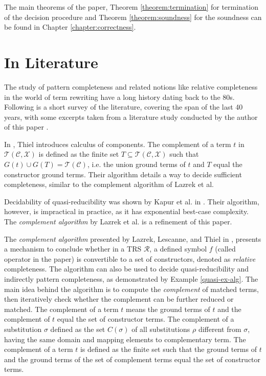 \documentclass{report}
\theoremstyle{definition}
\begin{document}
The main theorems of the paper, Theorem \ref{theorem:termination} for termination of the decision procedure and Theorem \ref{theorem:soundness} for the soundness can be found in Chapter \ref{chapter:correctness}.

\section{In Literature}\label{section:literature}
The study of pattern completeness and related notions like relative completeness in the world of term rewriting have a long history dating back to the 80s. Following is a short survey of the literature, covering the span of the last 40 years, with some excerpts taken from a literature study conducted by the author of this paper \cite{lit-me}.

In \cite{thiel}, Thiel introduces calculus of components. The complement of a term $t$ in $\mathcal{T}(\mathcal{C}, \mathcal{X})$ is defined as the finite set $T \subseteq \mathcal{T}(\mathcal{C}, \mathcal{X})$ such that $G(t) \cup G(T) = \mathcal{T}(\mathcal{C})$, i.e. the union ground terms of $t$ and $T$ equal the constructor ground terms. Their algorithm details a way to decide sufficient completeness, similar to the complement algorithm of Lazrek et al\cite{lazrek}.

Decidability of quasi-reducibility was shown by Kapur et al. in \cite{kapur}. Their algorithm, however, is impractical in practice, as it has exponential best-case complexity. The \textit{complement algorithm} by Lazrek et al. is a refinement of this paper.

The \textit{complement algorithm} presented by Lazrek, Lescanne, and Thiel in \cite{lazrek}, presents a mechanism to conclude whether in a TRS $\mathcal{R}$, a defined symbol $f$ (called operator in the paper) is convertible to a set of constructors, denoted as \textit{relative} completeness. The algorithm can also be used to decide quasi-reducibility and indirectly pattern completeness, as demonstrated by Example \ref{quasi-ex-alg}. The main idea behind the algorithm is to compute the \textit{complement} of matched terms, then iteratively check whether the complement can be further reduced or matched. The complement of a term $t$ means the ground terms of $t$ and the complement of $t$ equal the set of constructor terms. The complement of a substitution $\sigma$ defined as the set $C(\sigma)$ of all substitutions $\rho$ different from $\sigma$, having the same domain and mapping elements to complementary term. The complement of a term $t$ is defined as the finite set such that the ground terms of $t$ and the ground terms of the set of complement terms equal the set of constructor terms.
\end{document}
